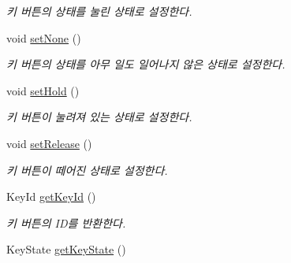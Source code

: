 \begin{DoxyCompactItemize}
\begin{DoxyCompactList}\small\item\em 키 버튼의 상태를 눌린 상태로 설정한다. \end{DoxyCompactList}\item 
\hypertarget{class_fk_key_button_a7abb7b8ae304953c283b4aa0ee5104b9}{}void \hyperlink{class_fk_key_button_a7abb7b8ae304953c283b4aa0ee5104b9}{set\+None} ()\label{class_fk_key_button_a7abb7b8ae304953c283b4aa0ee5104b9}

\begin{DoxyCompactList}\small\item\em 키 버튼의 상태를 아무 일도 일어나지 않은 상태로 설정한다. \end{DoxyCompactList}\item 
\hypertarget{class_fk_key_button_acc927d0ce6aaee7ba30c42d529938914}{}void \hyperlink{class_fk_key_button_acc927d0ce6aaee7ba30c42d529938914}{set\+Hold} ()\label{class_fk_key_button_acc927d0ce6aaee7ba30c42d529938914}

\begin{DoxyCompactList}\small\item\em 키 버튼이 눌려져 있는 상태로 설정한다. \end{DoxyCompactList}\item 
\hypertarget{class_fk_key_button_a0d85154697a21b4f16d2097a84a212fe}{}void \hyperlink{class_fk_key_button_a0d85154697a21b4f16d2097a84a212fe}{set\+Release} ()\label{class_fk_key_button_a0d85154697a21b4f16d2097a84a212fe}

\begin{DoxyCompactList}\small\item\em 키 버튼이 떼어진 상태로 설정한다. \end{DoxyCompactList}\item 
\hypertarget{class_fk_key_button_a9688b4c7605dc3405c7a159fc47c9aff}{}Key\+Id \hyperlink{class_fk_key_button_a9688b4c7605dc3405c7a159fc47c9aff}{get\+Key\+Id} ()\label{class_fk_key_button_a9688b4c7605dc3405c7a159fc47c9aff}

\begin{DoxyCompactList}\small\item\em 키 버튼의 I\+D를 반환한다. \end{DoxyCompactList}\item 
\hypertarget{class_fk_key_button_af469dae7f01964fb5732d90d78432128}{}Key\+State \hyperlink{class_fk_key_button_af469dae7f01964fb5732d90d78432128}{get\+Key\+State} ()\label{class_fk_key_button_af469dae7f01964fb5732d90d78432128}


\end{DoxyCompactItemize}

